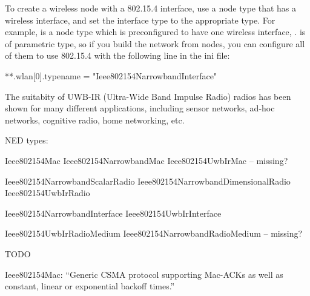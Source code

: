 To create a wireless node with a 802.15.4 interface, use a node type 
that has a wireless interface, and set the interface type to the 
appropriate type. For example,  is a node type 
which is preconfigured to have one wireless interface, .
 is of parametric type, so if you build the network from
 nodes, you can configure all of them to use
802.15.4 with the following line in the ini file:

\begin{inifile}
**.wlan[0].typename = "Ieee802154NarrowbandInterface"
\end{inifile}


The suitabity of UWB-IR (Ultra-Wide Band Impulse Radio) radios has been shown
for many different applications, including sensor networks, ad-hoc networks,
cognitive radio, home networking, etc.

NED types:

Ieee802154Mac
Ieee802154NarrowbandMac
Ieee802154UwbIrMac -- missing?

Ieee802154NarrowbandScalarRadio
Ieee802154NarrowbandDimensionalRadio
Ieee802154UwbIrRadio

Ieee802154NarrowbandInterface
Ieee802154UwbIrInterface

Ieee802154UwbIrRadioMedium
Ieee802154NarrowbandRadioMedium -- missing?


TODO

Ieee802154Mac: ``Generic CSMA protocol supporting Mac-ACKs as well as
constant, linear or exponential backoff times.''

\fi


